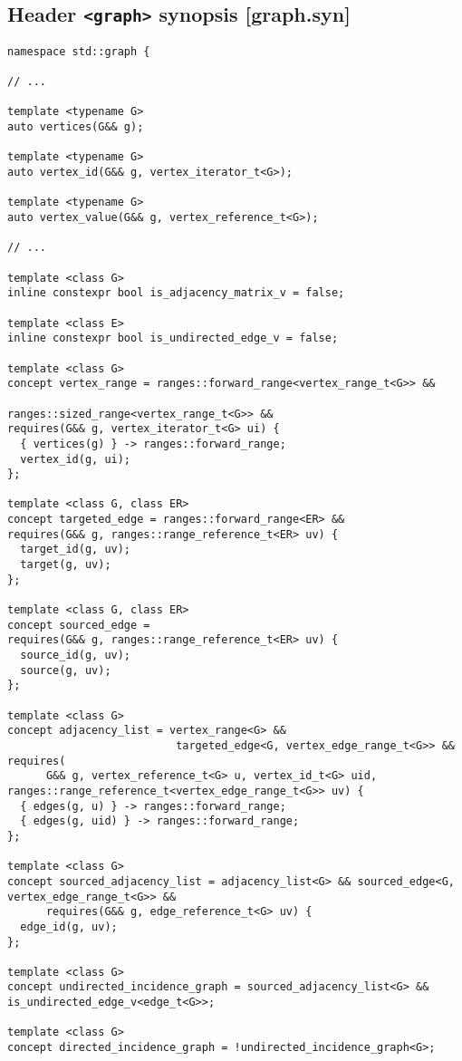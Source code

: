 \documentclass[10pt,onecolumn]{article}
\newcommand{\tcode}[1]{\lstinline[breaklines=true]{#1}}
\begin{document}
\subsection{Header \tcode{<graph>} synopsis [graph.syn]}

\begin{lstlisting}
namespace std::graph {

// ...

template <typename G>
auto vertices(G&& g);

template <typename G>
auto vertex_id(G&& g, vertex_iterator_t<G>);

template <typename G>
auto vertex_value(G&& g, vertex_reference_t<G>);

// ...

template <class G>
inline constexpr bool is_adjacency_matrix_v = false;

template <class E>
inline constexpr bool is_undirected_edge_v = false;

template <class G>
concept vertex_range = ranges::forward_range<vertex_range_t<G>> && 
                                   ranges::sized_range<vertex_range_t<G>> &&
requires(G&& g, vertex_iterator_t<G> ui) {
  { vertices(g) } -> ranges::forward_range;
  vertex_id(g, ui);
};

template <class G, class ER>
concept targeted_edge = ranges::forward_range<ER> && 
requires(G&& g, ranges::range_reference_t<ER> uv) {
  target_id(g, uv);
  target(g, uv);
};

template <class G, class ER>
concept sourced_edge = 
requires(G&& g, ranges::range_reference_t<ER> uv) {
  source_id(g, uv);
  source(g, uv);
};

template <class G>
concept adjacency_list = vertex_range<G> && 
                          targeted_edge<G, vertex_edge_range_t<G>> &&   
requires(
      G&& g, vertex_reference_t<G> u, vertex_id_t<G> uid, ranges::range_reference_t<vertex_edge_range_t<G>> uv) {
  { edges(g, u) } -> ranges::forward_range;
  { edges(g, uid) } -> ranges::forward_range;
};

template <class G>
concept sourced_adjacency_list = adjacency_list<G> && sourced_edge<G, vertex_edge_range_t<G>> &&
      requires(G&& g, edge_reference_t<G> uv) {
  edge_id(g, uv);
};

template <class G>
concept undirected_incidence_graph = sourced_adjacency_list<G> && is_undirected_edge_v<edge_t<G>>;

template <class G>
concept directed_incidence_graph = !undirected_incidence_graph<G>;


\end{lstlisting}
\end{document}

